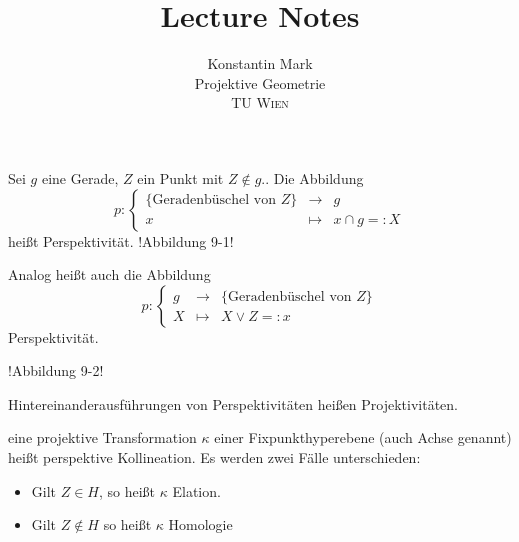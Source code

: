 \documentclass[11pt]{article}
\title{Lecture Notes}
\author{Konstantin Mark\\
Projektive Geometrie\\ 
\textsc{TU Wien}
}
\begin{document}
\maketitle

\begin{definition}
Sei $g$ eine Gerade, $Z$ ein Punkt mit $Z\notin g$.. Die Abbildung \begin{equation*}
    p: \left\{\begin{array}{ccc}
         \{\text{Geradenbüschel von } Z\}&\to &g  \\
         x&\mapsto &x\cap g =:X 
    \end{array}\right.
\end{equation*}
heißt Perspektivität.
!Abbildung 9-1!
\end{definition}
\begin{definition}
Analog heißt auch die Abbildung 
\begin{equation*}
    p: \left\{\begin{array}{ccc}
         g&\to &\{\text{Geradenbüschel von } Z\}  \\
         X&\mapsto &X\lor Z =:x 
    \end{array}\right.
\end{equation*} Perspektivität.
\end{definition}
\begin{remark}
!Abbildung 9-2!
\end{remark}
\begin{definition}
Hintereinanderausführungen von Perspektivitäten heißen Projektivitäten.
\end{definition}
\begin{definition}
eine projektive Transformation $\kappa$ einer Fixpunkthyperebene (auch Achse genannt) heißt perspektive Kollineation. Es werden zwei Fälle unterschieden:
\begin{itemize}
    \item Gilt $Z\in H$, so heißt $\kappa$ Elation.
    \item Gilt $Z\not\in H$ so heißt $\kappa$ Homologie
\end{itemize}
\end{definition}
\end{document}
